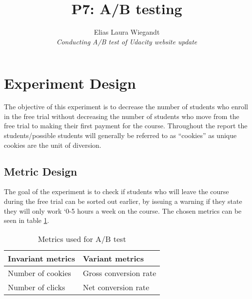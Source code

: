 \documentclass[12pt]{article}
\begin{document}
  
\title{P7: A/B testing}
\author{Elias Laura Wiegandt\\ 
\textit{Conducting A/B test of Udacity website update}}
 
\maketitle

\section{Experiment Design}
The objective of this experiment is to decrease the number of students who enroll in the free trial without decreasing the number of students who move from the free trial to making their first payment for the course. \newline
Throughout the report the students/possible students will generally be referred to as ``cookies'' as unique cookies are the unit of diversion.

\subsection{Metric Design}
The goal of the experiment is to check if students who will leave the course during the free trial can be sorted out earlier, by issuing a warning if they state they will only work `0-5 hours a week on the course. 
\newline
The chosen metrics can be seen in table \ref{tbl:metrics}. 

\begin{table}[ht]
\centering
\caption{Metrics used for A/B test}
\label{tbl:metrics}
\begin{tabular}{@{}ll@{}}
\toprule
\textbf{Invariant metrics} & \textbf{Variant metrics} \\
\midrule
Number of cookies 	&	Gross conversion rate	\\
Number of clicks 		& Net conversion rate   \\
\bottomrule
\end{tabular}
\end{table}
\end{document}
